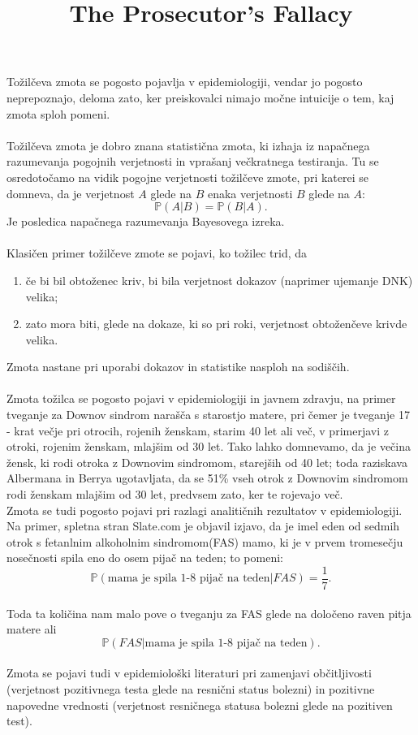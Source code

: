 \documentclass[a4paper,12pt]{article}
\begin{document}
\title{The Prosecutor's Fallacy}
\maketitle

Tožilčeva zmota se pogosto pojavlja v epidemiologiji, vendar jo pogosto neprepoznajo, deloma zato, ker preiskovalci nimajo močne intuicije 
o tem, kaj zmota sploh pomeni. \\
\\
Tožilčeva zmota je dobro znana statistična zmota, ki izhaja iz napačnega razumevanja pogojnih verjetnosti in vprašanj večkratnega testiranja. 
Tu se osredotočamo na vidik pogojne verjetnosti tožilčeve zmote, pri katerei se domneva, da je verjetnost $A$ glede na $B$ enaka verjetnosti 
$B$ glede na $A$:
$$ \mathbb{P}(A \lvert B) = \mathbb{P}(B \lvert A). $$
Je posledica napačnega razumevanja Bayesovega izreka. \\
\\
Klasičen primer tožilčeve zmote se pojavi, ko tožilec trid, da
\begin{enumerate}
    \item če bi bil obtoženec kriv, bi bila verjetnost dokazov (naprimer ujemanje DNK) velika;
    \item zato mora biti, glede na dokaze, ki so pri roki, verjetnost obtoženčeve krivde velika.
\end{enumerate}
Zmota nastane pri uporabi dokazov in statistike nasploh na sodiščih.
\\
\\
Zmota tožilca se pogosto pojavi v epidemiologiji in javnem zdravju, na primer tveganje za Downov sindrom narašča s starostjo matere, pri čemer je 
tveganje 17 - krat večje pri otrocih, rojenih ženskam, starim 40 let ali več, v primerjavi z otroki, rojenim ženskam, mlajšim od 30 let. Tako lahko 
domnevamo, da je večina žensk, ki rodi otroka z Downovim sindromom, starejših od 40 let; toda raziskava Albermana in Berrya ugotavljata, da se 51\% vseh 
otrok z Downovim sindromom rodi ženskam mlajšim od 30 let, predvsem zato, ker te rojevajo več. \\
Zmota se tudi pogosto pojavi pri razlagi analitičnih rezultatov v epidemiologiji. Na primer, spletna stran Slate.com je objavil izjavo, da je imel eden od 
sedmih otrok s fetanlnim alkoholnim sindromom(FAS) mamo, ki je v prvem tromesečju nosečnosti spila eno do osem pijač na teden; to pomeni: \\
\[ \mathbb{P}(\text{mama je spila 1-8 pijač na teden} \lvert FAS) = \frac{1}{7}.\] \\
Toda ta količina nam malo pove o tveganju za FAS glede na določeno raven pitja matere ali \\
\[\mathbb{P}(FAS \lvert \text{mama je spila 1-8 pijač na teden}).\]
\\
Zmota se pojavi tudi v epidemiološki literaturi pri zamenjavi občitljivosti (verjetnost pozitivnega testa glede na resnični status bolezni) in pozitivne 
napovedne vrednosti (verjetnost resničnega statusa bolezni glede na pozitiven test).
\end{document}
